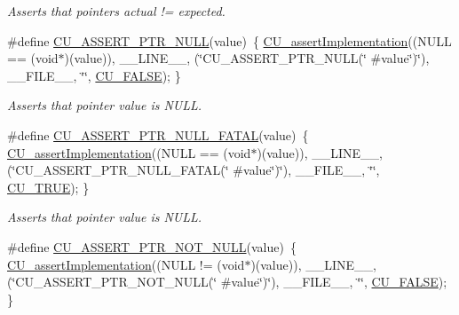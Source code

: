 \begin{DoxyCompactItemize}
\begin{DoxyCompactList}\small\item\em Asserts that pointers actual != expected. \end{DoxyCompactList}\item 
\#define \hyperlink{group__Framework_ga4b8a3f1011635ac3596c13714e1fb03b}{C\-U\-\_\-\-A\-S\-S\-E\-R\-T\-\_\-\-P\-T\-R\-\_\-\-N\-U\-L\-L}(value)~\{ \hyperlink{group__Framework_ga31a858e8b496b2af992b63902064c5fa}{C\-U\-\_\-assert\-Implementation}((N\-U\-L\-L == (void$\ast$)(value)), \-\_\-\-\_\-\-L\-I\-N\-E\-\_\-\-\_\-, (\char`\"{}C\-U\-\_\-\-A\-S\-S\-E\-R\-T\-\_\-\-P\-T\-R\-\_\-\-N\-U\-L\-L(\char`\"{} \#value\char`\"{})\char`\"{}), \-\_\-\-\_\-\-F\-I\-L\-E\-\_\-\-\_\-, \char`\"{}\char`\"{}, \hyperlink{group__Framework_ga7453214541b156ef868681eaafe60860}{C\-U\-\_\-\-F\-A\-L\-S\-E}); \}
\begin{DoxyCompactList}\small\item\em Asserts that pointer value is N\-U\-L\-L. \end{DoxyCompactList}\item 
\#define \hyperlink{group__Framework_ga6078f8d91d417f24b338819408985da1}{C\-U\-\_\-\-A\-S\-S\-E\-R\-T\-\_\-\-P\-T\-R\-\_\-\-N\-U\-L\-L\-\_\-\-F\-A\-T\-A\-L}(value)~\{ \hyperlink{group__Framework_ga31a858e8b496b2af992b63902064c5fa}{C\-U\-\_\-assert\-Implementation}((N\-U\-L\-L == (void$\ast$)(value)), \-\_\-\-\_\-\-L\-I\-N\-E\-\_\-\-\_\-, (\char`\"{}C\-U\-\_\-\-A\-S\-S\-E\-R\-T\-\_\-\-P\-T\-R\-\_\-\-N\-U\-L\-L\-\_\-\-F\-A\-T\-A\-L(\char`\"{} \#value\char`\"{})\char`\"{}), \-\_\-\-\_\-\-F\-I\-L\-E\-\_\-\-\_\-, \char`\"{}\char`\"{}, \hyperlink{group__Framework_ga99641394bc766ca9c4a295e942fed1ef}{C\-U\-\_\-\-T\-R\-U\-E}); \}
\begin{DoxyCompactList}\small\item\em Asserts that pointer value is N\-U\-L\-L. \end{DoxyCompactList}\item 
\#define \hyperlink{group__Framework_gac5319ca4cf950f8c0c3a689d17e46212}{C\-U\-\_\-\-A\-S\-S\-E\-R\-T\-\_\-\-P\-T\-R\-\_\-\-N\-O\-T\-\_\-\-N\-U\-L\-L}(value)~\{ \hyperlink{group__Framework_ga31a858e8b496b2af992b63902064c5fa}{C\-U\-\_\-assert\-Implementation}((N\-U\-L\-L != (void$\ast$)(value)), \-\_\-\-\_\-\-L\-I\-N\-E\-\_\-\-\_\-, (\char`\"{}C\-U\-\_\-\-A\-S\-S\-E\-R\-T\-\_\-\-P\-T\-R\-\_\-\-N\-O\-T\-\_\-\-N\-U\-L\-L(\char`\"{} \#value\char`\"{})\char`\"{}), \-\_\-\-\_\-\-F\-I\-L\-E\-\_\-\-\_\-, \char`\"{}\char`\"{}, \hyperlink{group__Framework_ga7453214541b156ef868681eaafe60860}{C\-U\-\_\-\-F\-A\-L\-S\-E}); \}

\end{DoxyCompactItemize}
